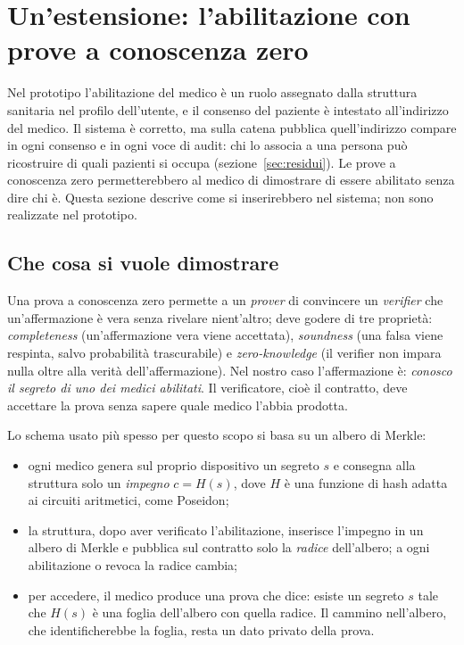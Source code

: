 \section{Un'estensione: l'abilitazione con prove a conoscenza zero}\label{sec:zkp}

Nel prototipo l'abilitazione del medico è un ruolo assegnato dalla struttura sanitaria nel profilo dell'utente, e il consenso del paziente è intestato all'indirizzo del medico. Il sistema è corretto, ma sulla catena pubblica quell'indirizzo compare in ogni consenso e in ogni voce di audit: chi lo associa a una persona può ricostruire di quali pazienti si occupa (sezione~\ref{sec:residui}). Le prove a conoscenza zero permetterebbero al medico di dimostrare di essere abilitato senza dire chi è. Questa sezione descrive come si inserirebbero nel sistema; non sono realizzate nel prototipo.

\subsection{Che cosa si vuole dimostrare}
Una prova a conoscenza zero permette a un \emph{prover} di convincere un \emph{verifier} che un'affermazione è vera senza rivelare nient'altro\cite{gmr}; deve godere di tre proprietà: \emph{completeness} (un'affermazione vera viene accettata), \emph{soundness} (una falsa viene respinta, salvo probabilità trascurabile) e \emph{zero-knowledge} (il verifier non impara nulla oltre alla verità dell'affermazione). Nel nostro caso l'affermazione è: \emph{conosco il segreto di uno dei medici abilitati}. Il verificatore, cioè il contratto, deve accettare la prova senza sapere quale medico l'abbia prodotta.

Lo schema usato più spesso per questo scopo si basa su un albero di Merkle:
\begin{itemize}
  \item ogni medico genera sul proprio dispositivo un segreto $s$ e consegna alla struttura solo un \emph{impegno} $c = H(s)$, dove $H$ è una funzione di hash adatta ai circuiti aritmetici, come Poseidon\cite{poseidon};
  \item la struttura, dopo aver verificato l'abilitazione, inserisce l'impegno in un albero di Merkle e pubblica sul contratto solo la \emph{radice} dell'albero; a ogni abilitazione o revoca la radice cambia;
  \item per accedere, il medico produce una prova che dice: esiste un segreto $s$ tale che $H(s)$ è una foglia dell'albero con quella radice. Il cammino nell'albero, che identificherebbe la foglia, resta un dato privato della prova.
\end{itemize}

